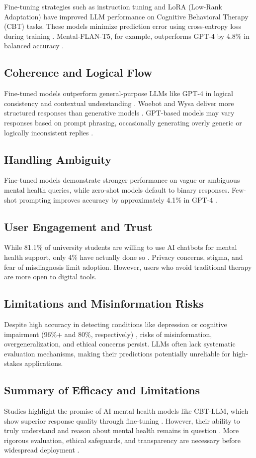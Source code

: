 Fine-tuning strategies such as instruction tuning and LoRA (Low-Rank Adaptation) have improved LLM performance on Cognitive Behavioral Therapy (CBT) tasks. These models minimize prediction error using cross-entropy loss during training \cite{na2024}. Mental-FLAN-T5, for example, outperforms GPT-4 by 4.8\% in balanced accuracy \cite{xu2024}.

\subsection{Coherence and Logical Flow}

Fine-tuned models outperform general-purpose LLMs like GPT-4 in logical consistency and contextual understanding \cite{stade2024}. Woebot and Wysa deliver more structured responses than generative models \cite{greco2023}. GPT-based models may vary responses based on prompt phrasing, occasionally generating overly generic or logically inconsistent replies \cite{sejnowski2023}.

\subsection{Handling Ambiguity}

Fine-tuned models demonstrate stronger performance on vague or ambiguous mental health queries, while zero-shot models default to binary responses. Few-shot prompting improves accuracy by approximately 4.1\% in GPT-4 \cite{xu2024}.

\subsection{User Engagement and Trust}

While 81.1\% of university students are willing to use AI chatbots for mental health support, only 4\% have actually done so \cite{gbollie2023}. Privacy concerns, stigma, and fear of misdiagnosis limit adoption. However, users who avoid traditional therapy are more open to digital tools.

\subsection{Limitations and Misinformation Risks}

Despite high accuracy in detecting conditions like depression or cognitive impairment (96\%+ and 80\%, respectively) \cite{greco2023}, risks of misinformation, overgeneralization, and ethical concerns persist. LLMs often lack systematic evaluation mechanisms, making their predictions potentially unreliable for high-stakes applications.

\subsection{Summary of Efficacy and Limitations}

Studies highlight the promise of AI mental health models like CBT-LLM, which show superior response quality through fine-tuning \cite{na2024}. However, their ability to truly understand and reason about mental health remains in question \cite{sejnowski2023}. More rigorous evaluation, ethical safeguards, and transparency are necessary before widespread deployment \cite{stade2024, li2023}.
